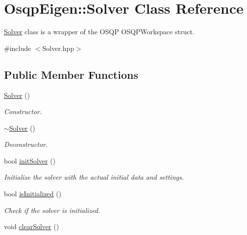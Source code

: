 \section{Osqp\+Eigen\+:\+:Solver Class Reference}
\label{classOsqpEigen_1_1Solver}


\hyperlink{classOsqpEigen_1_1Solver}{Solver} class is a wrapper of the O\+S\+QP O\+S\+Q\+P\+Workspace struct.  




{\ttfamily \#include $<$Solver.\+hpp$>$}

\subsection*{Public Member Functions}
\begin{DoxyCompactItemize}
\item 
\hyperlink{classOsqpEigen_1_1Solver_a4de5403060c8798d0e138aaff0158cf9}{Solver} ()\label{classOsqpEigen_1_1Solver_a4de5403060c8798d0e138aaff0158cf9}

\begin{DoxyCompactList}\small\item\em Constructor. \end{DoxyCompactList}\item 
\hyperlink{classOsqpEigen_1_1Solver_a9539d922fa2e901a608155fb8e9385a5}{$\sim$\+Solver} ()\label{classOsqpEigen_1_1Solver_a9539d922fa2e901a608155fb8e9385a5}

\begin{DoxyCompactList}\small\item\em Deconstructor. \end{DoxyCompactList}\item 
bool \hyperlink{classOsqpEigen_1_1Solver_a8487090a685d7653ea4011971c2f21f7}{init\+Solver} ()
\begin{DoxyCompactList}\small\item\em Initialize the solver with the actual initial data and settings. \end{DoxyCompactList}\item 
bool \hyperlink{classOsqpEigen_1_1Solver_a05c8a18a9d9ed9a74fc0dc26af711348}{is\+Initialized} ()
\begin{DoxyCompactList}\small\item\em Check if the solver is initialized. \end{DoxyCompactList}\item 
void \hyperlink{classOsqpEigen_1_1Solver_a34214395818d23bc1552fc9bbcf0f47b}{clear\+Solver} ()\label{classOsqpEigen_1_1Solver_a34214395818d23bc1552fc9bbcf0f47b}


\end{DoxyCompactItemize}

